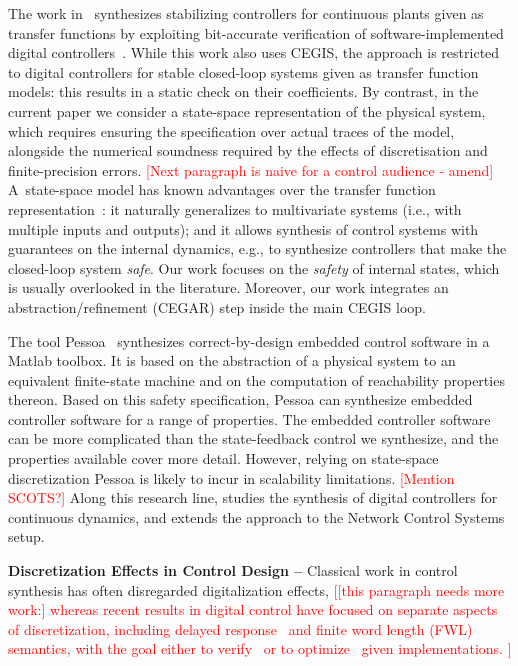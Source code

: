 \documentclass[twocolumn]{autart}    %
\renewcommand{\note}[1]{\textcolor{red}{[#1]}}
\begin{document}
The work in~\cite{hscc-paper} synthesizes stabilizing controllers for
continuous plants given as transfer functions by exploiting bit-accurate
verification of software-implemented digital controllers~\cite{Bessa16}. 
While this work also uses CEGIS, the approach is restricted to digital
controllers for stable closed-loop systems given as transfer function
models: this results in a static check on their coefficients.  By contrast,
in the current paper we consider a state-space representation of the
physical system, which requires ensuring the specification over actual
traces of the model, alongside the numerical soundness required by the
effects of discretisation and finite-precision errors.  
\note{Next paragraph is naive for a control audience - amend} 
A~state-space model
has known advantages over the transfer function
representation~\cite{Franklin15}: it naturally generalizes to multivariate
systems (i.e., with multiple inputs and outputs); and it allows synthesis of
control systems with guarantees on the internal dynamics, e.g., to
synthesize controllers that make the closed-loop system \emph{safe}.  Our
work focuses on the \emph{safety} of internal states, which is usually
overlooked in the literature.  Moreover, our work integrates an
abstraction/refinement (CEGAR) step inside the main CEGIS loop.

The tool Pessoa~\cite{mazo2010pessoa} synthesizes correct-by-design embedded
control software in a Matlab toolbox.  It is based on the abstraction of a
physical system to an equivalent finite-state machine and on the computation
of reachability properties thereon.  Based on this safety specification,
\mbox{Pessoa} can synthesize embedded controller software for a range of
properties.  The embedded controller software can be more complicated than
the state-feedback control we synthesize, and the properties available cover
more detail.  However, relying on state-space discretization \mbox{Pessoa}
is likely to incur in scalability limitations.  \note{Mention SCOTS?}
Along this research line,
\cite{Anta2010,liu16} studies the synthesis of digital controllers for
continuous dynamics, and \cite{zamani2014} extends the approach to the Network Control Systems setup. 

\textbf{Discretization Effects in Control Design --}
Classical work in control synthesis has often disregarded digitalization effects, 
\note{[this paragraph needs more work:]
whereas recent results in digital control have focused on separate aspects of discretization, 
including delayed response~\cite{Duggirala2015} and finite word length (FWL) semantics, 
with the goal either to verify~\cite{daes20161} or to optimize~\cite{oudjida2014design} given implementations. }
\end{document}
